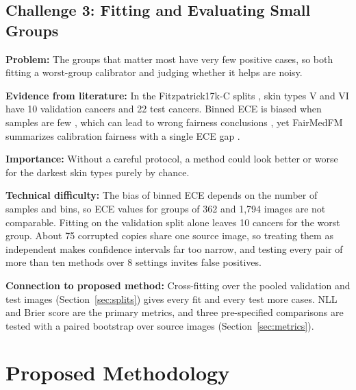 \documentclass[sigconf,nonacm]{acmart}
\begin{document}
\subsection{Challenge 3: Fitting and Evaluating Small Groups}
\label{sec:ch3}

\textbf{Problem:} The groups that matter most have very few positive cases, so both fitting a worst-group calibrator and judging whether it helps are noisy.

\textbf{Evidence from literature:} In the Fitzpatrick17k-C splits \cite{abhishek2025quality}, skin types V and VI have 10 validation cancers and 22 test cancers. Binned ECE is biased when samples are few \cite{kumar2019verified,roelofs2022mitigating}, which can lead to wrong fairness conclusions \cite{riccilara2023calibration}, yet FairMedFM summarizes calibration fairness with a single ECE gap \cite{jin2024fairmedfm}.

\textbf{Importance:} Without a careful protocol, a method could look better or worse for the darkest skin types purely by chance.

\textbf{Technical difficulty:} The bias of binned ECE depends on the number of samples and bins, so ECE values for groups of 362 and 1,794 images are not comparable. Fitting on the validation split alone leaves 10 cancers for the worst group. About 75 corrupted copies share one source image, so treating them as independent makes confidence intervals far too narrow, and testing every pair of more than ten methods over 8 settings invites false positives.

\textbf{Connection to proposed method:} Cross-fitting over the pooled validation and test images (Section~\ref{sec:splits}) gives every fit and every test more cases. NLL and Brier score are the primary metrics, and three pre-specified comparisons are tested with a paired bootstrap over source images (Section~\ref{sec:metrics}).

\section{Proposed Methodology}
\label{sec:method}
\end{document}

